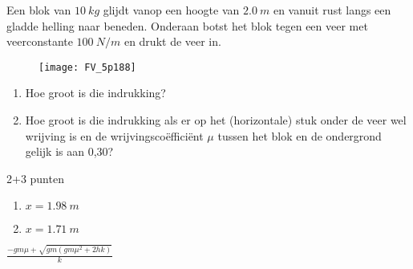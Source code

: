 


\item{}Een blok van $\SI{10}{kg}$ glijdt vanop een hoogte van $\SI{2,0}{m}$ en vanuit rust langs een gladde helling naar beneden. Onderaan botst het blok tegen een veer met veerconstante $\SI{100}{N/m}$ en drukt de veer in.
\begin{figure}[h]
\centering
\texttt{[image: FV\_5p188]}
\end{figure}
\begin{enumerate}
\item Hoe groot is die indrukking?
\item Hoe groot is die indrukking als er op het (horizontale) stuk onder de veer wel wrijving is en de wrijvingsco\"effici\"ent $\mu$ tussen het blok en de ondergrond gelijk is aan 0,30?
\end{enumerate}

\begin{oplossing}
2+3 punten

\begin{enumerate}
	\item $x=\SI{1,98}{m}$
	\item $x=\SI{1,71}{m}$
\end{enumerate}
$\displaystyle\frac{- g m \mu + \sqrt{g m \left(g m \mu^{2} + 2 h k\right)}}{k}$
\end{oplossing}